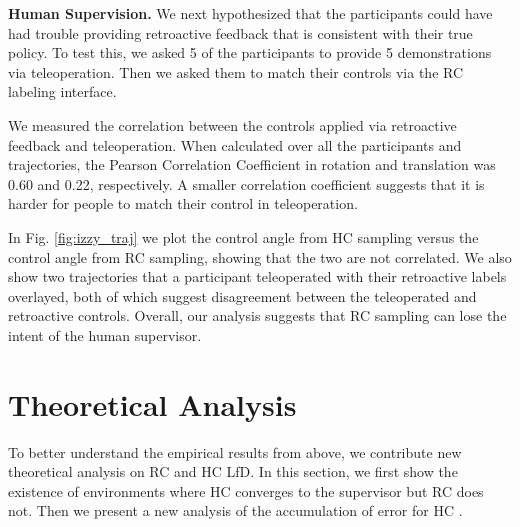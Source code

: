 \documentclass[10pt, conference]{ieeeconf}      %
\newcommand{\ns}{HC }
\begin{document}
\noindent\textbf{Human Supervision. }We next hypothesized that the participants could have had trouble providing retroactive feedback that is consistent with their true policy. To test this, we asked 5 of the participants to provide 5 demonstrations via teleoperation. Then we asked them to match their controls via the RC labeling interface. 

We measured the correlation between the controls applied via retroactive feedback and teleoperation. When calculated over all the participants and trajectories, the Pearson Correlation Coefficient in rotation and translation was 0.60 and 0.22, respectively. A smaller correlation coefficient suggests that it is harder for people to match their control in teleoperation. 

In Fig. \ref{fig:izzy_traj} we plot the control angle from HC sampling versus the control angle from RC sampling, showing that the two are not correlated. We also show two trajectories that a participant teleoperated with their retroactive labels overlayed, both of which suggest disagreement between the teleoperated and retroactive controls. Overall, our analysis suggests that RC sampling can lose the intent of the human supervisor. 


\section{Theoretical Analysis} 
To better understand the empirical results from above, we contribute new theoretical analysis on RC and HC LfD. In this section, we first show the existence of environments where HC converges to the supervisor but RC does not. Then we present a new analysis of the accumulation of error for \ns. 
\end{document}
